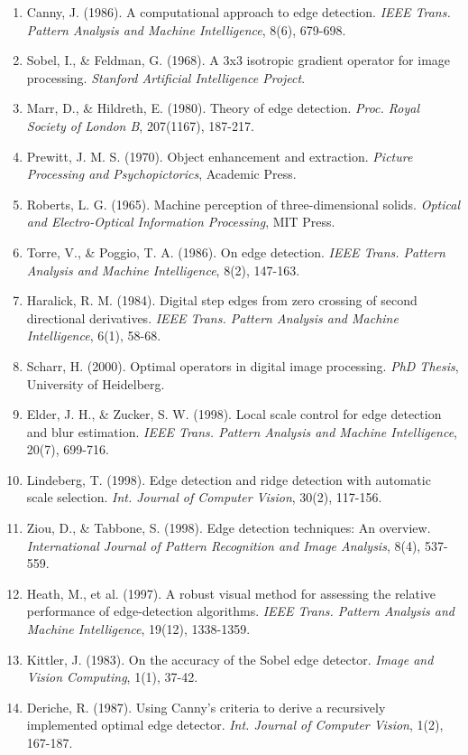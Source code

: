 \documentclass[a4paper, 11pt]{article}
\begin{document}
\begin{enumerate}
\item Canny, J. (1986). A computational approach to edge detection. \textit{IEEE Trans. Pattern Analysis and Machine Intelligence}, 8(6), 679-698.
\item Sobel, I., \& Feldman, G. (1968). A 3x3 isotropic gradient operator for image processing. \textit{Stanford Artificial Intelligence Project}.
\item Marr, D., \& Hildreth, E. (1980). Theory of edge detection. \textit{Proc. Royal Society of London B}, 207(1167), 187-217.
\item Prewitt, J. M. S. (1970). Object enhancement and extraction. \textit{Picture Processing and Psychopictorics}, Academic Press.
\item Roberts, L. G. (1965). Machine perception of three-dimensional solids. \textit{Optical and Electro-Optical Information Processing}, MIT Press.
\item Torre, V., \& Poggio, T. A. (1986). On edge detection. \textit{IEEE Trans. Pattern Analysis and Machine Intelligence}, 8(2), 147-163.
\item Haralick, R. M. (1984). Digital step edges from zero crossing of second directional derivatives. \textit{IEEE Trans. Pattern Analysis and Machine Intelligence}, 6(1), 58-68.
\item Scharr, H. (2000). Optimal operators in digital image processing. \textit{PhD Thesis}, University of Heidelberg.
\item Elder, J. H., \& Zucker, S. W. (1998). Local scale control for edge detection and blur estimation. \textit{IEEE Trans. Pattern Analysis and Machine Intelligence}, 20(7), 699-716.
\item Lindeberg, T. (1998). Edge detection and ridge detection with automatic scale selection. \textit{Int. Journal of Computer Vision}, 30(2), 117-156.
\item Ziou, D., \& Tabbone, S. (1998). Edge detection techniques: An overview. \textit{International Journal of Pattern Recognition and Image Analysis}, 8(4), 537-559.
\item Heath, M., et al. (1997). A robust visual method for assessing the relative performance of edge-detection algorithms. \textit{IEEE Trans. Pattern Analysis and Machine Intelligence}, 19(12), 1338-1359.
\item Kittler, J. (1983). On the accuracy of the Sobel edge detector. \textit{Image and Vision Computing}, 1(1), 37-42.
\item Deriche, R. (1987). Using Canny's criteria to derive a recursively implemented optimal edge detector. \textit{Int. Journal of Computer Vision}, 1(2), 167-187.

\end{enumerate}
\end{document}
